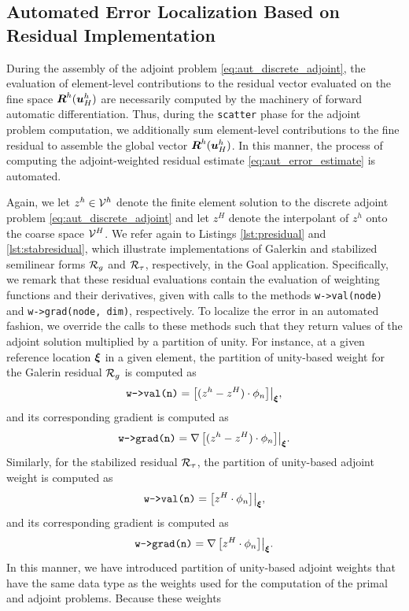 \subsection{Automated Error Localization Based on Residual Implementation}

During the assembly of the adjoint problem
\eqref{eq:aut_discrete_adjoint}, the evaluation of element-level
contributions to the residual vector evaluated on the fine space
$\boldsymbol{R}^h(\boldsymbol{u}^h_H)$ are necessarily computed by the machinery
of forward automatic differentiation. Thus,
during the \texttt{scatter} phase for the adjoint problem computation,
we additionally sum element-level contributions to the fine residual
to assemble the global vector $\boldsymbol{R}^h(\boldsymbol{u}^h_H)$. In this manner,
the process of computing the adjoint-weighted residual estimate
\eqref{eq:aut_error_estimate} is automated.


Again, we let $z^h \in \mathcal{V}^h$ denote the finite element solution to
the discrete adjoint problem \eqref{eq:aut_discrete_adjoint} and let
$z^H$ denote the interpolant of $z^h$ onto the coarse space $\mathcal{V}^H$.
We refer again to Listings \ref{lst:presidual} and \ref{lst:stabresidual},
which illustrate implementations of Galerkin and stabilized semilinear
forms $\mathcal{R}_g$ and $\mathcal{R}_{\tau}$, respectively, in the Goal application.
Specifically, we remark that these residual evaluations contain
the evaluation of weighting functions and their derivatives, given with
calls to the methods \texttt{w->val(node)} and \texttt{w->grad(node, dim)},
respectively. To localize the error in an automated fashion, we override
the calls to these methods such that they return values of the adjoint
solution multiplied by a partition of unity. For instance, at a given
reference location $\boldsymbol{\xi}$ in a given element, the
partition of unity-based
weight for the Galerin residual $\mathcal{R}_g$ is computed as
%
\begin{gather}
\texttt{w->val(n)} = \left[ (z^h - z^H) \cdot \phi_n \right] \bigr|_{\boldsymbol{\xi}},
\end{gather}
%
and its corresponding gradient is computed as
%
\begin{gather}
\texttt{w->grad(n)} = \nabla \left[ ( z^h - z^H) \cdot \phi_n \right] \bigr|_{\boldsymbol{\xi}}.
\end{gather}
%
Similarly, for the stabilized residual $\mathcal{R}_{\tau}$, the
partition of unity-based adjoint
weight is computed as
%
\begin{gather}
\texttt{w->val(n)} = \left[ z^H \cdot \phi_n \right] \bigr|_{\boldsymbol{\xi}},
\end{gather}
%
and its corresponding gradient is computed as
%
\begin{gather}
\texttt{w->grad(n)} = \nabla \left[  z^H \cdot \phi_n \right] \bigr|_{\boldsymbol{\xi}}.
\end{gather}
%
In this manner, we have introduced partition of unity-based adjoint weights
that have the
same data type as the weights used for the computation of the primal and
adjoint problems. Because these weights 

